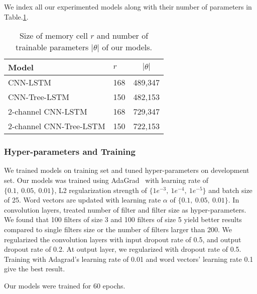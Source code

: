 We index all our experimented models along with their number of parameters in Table.\ref{table:paramtable}.
\begin{table}[H]
	\centering
	\caption{Size of memory cell \(r\) and number of trainable parameters \(\left\vert{\theta}\right\vert\) of our models.
	}
	\label{table:paramtable}
	\begin{tabular}{|l|l|l|}
		\hline
		Model & \(r\) & \multicolumn{1}{|c|}{\(\left\vert{\theta}\right\vert\)}\\ \hline
		CNN-LSTM                 & 168         & 489,347          \\
		CNN-Tree-LSTM            & 150         & 482,153          \\
		2-channel CNN-LSTM       & 168         & 729,347          \\
		2-channel CNN-Tree-LSTM  & 150         &
		722,153 \\
		\hline
	\end{tabular}
\end{table}
\subsubsection{Hyper-parameters and Training}
We trained models on training set and tuned hyper-parameters on development set.
Our models was trained using AdaGrad~\cite{duchi2011adaptive} with learning rate of $\{0.1,~ 0.05,~ 0.01\}$, L2 regularization strength of $\{1e^{-3},~ 1e^{-4}, ~ 1e^{-5} \}$ and batch size of 25.
Word vectors are updated with learning rate $\alpha$ of $\{0.1,~0.05, ~0.01\}$.
In convolution layers, treated number of filter and filter size as hyper-parameters.
We found that 100 filters of size 3 and 100 filters of size 5 yield better results compared to single filters size or the number of filters larger than 200.
We regularized the convolution layers with input dropout rate of 0.5, and output dropout rate of 0.2. At output layer, we regularized with dropout rate of 0.5.
Training with Adagrad's learning rate of 0.01 and word vectors' learning rate 0.1 give the best result.

Our models were trained for 60 epochs.
